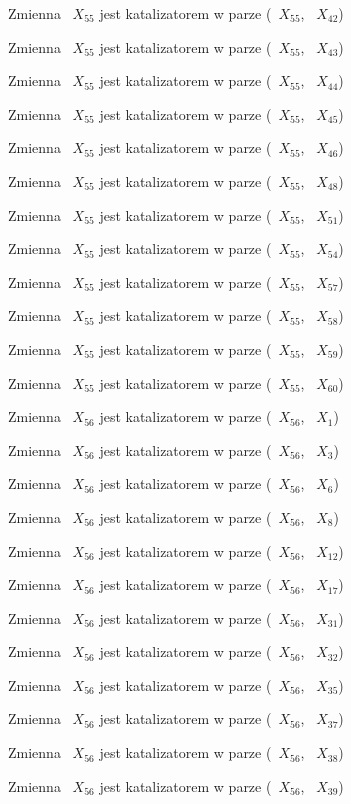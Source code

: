 \documentclass{article}
\begin{document}
Zmienna ~$X_{55}$ jest katalizatorem w parze (~$X_{55}$, ~$X_{42}$)

Zmienna ~$X_{55}$ jest katalizatorem w parze (~$X_{55}$, ~$X_{43}$)

Zmienna ~$X_{55}$ jest katalizatorem w parze (~$X_{55}$, ~$X_{44}$)

Zmienna ~$X_{55}$ jest katalizatorem w parze (~$X_{55}$, ~$X_{45}$)

Zmienna ~$X_{55}$ jest katalizatorem w parze (~$X_{55}$, ~$X_{46}$)

Zmienna ~$X_{55}$ jest katalizatorem w parze (~$X_{55}$, ~$X_{48}$)

Zmienna ~$X_{55}$ jest katalizatorem w parze (~$X_{55}$, ~$X_{51}$)

Zmienna ~$X_{55}$ jest katalizatorem w parze (~$X_{55}$, ~$X_{54}$)

Zmienna ~$X_{55}$ jest katalizatorem w parze (~$X_{55}$, ~$X_{57}$)

Zmienna ~$X_{55}$ jest katalizatorem w parze (~$X_{55}$, ~$X_{58}$)

Zmienna ~$X_{55}$ jest katalizatorem w parze (~$X_{55}$, ~$X_{59}$)

Zmienna ~$X_{55}$ jest katalizatorem w parze (~$X_{55}$, ~$X_{60}$)

Zmienna ~$X_{56}$ jest katalizatorem w parze (~$X_{56}$, ~$X_{1}$)

Zmienna ~$X_{56}$ jest katalizatorem w parze (~$X_{56}$, ~$X_{3}$)

Zmienna ~$X_{56}$ jest katalizatorem w parze (~$X_{56}$, ~$X_{6}$)

Zmienna ~$X_{56}$ jest katalizatorem w parze (~$X_{56}$, ~$X_{8}$)

Zmienna ~$X_{56}$ jest katalizatorem w parze (~$X_{56}$, ~$X_{12}$)

Zmienna ~$X_{56}$ jest katalizatorem w parze (~$X_{56}$, ~$X_{17}$)

Zmienna ~$X_{56}$ jest katalizatorem w parze (~$X_{56}$, ~$X_{31}$)

Zmienna ~$X_{56}$ jest katalizatorem w parze (~$X_{56}$, ~$X_{32}$)

Zmienna ~$X_{56}$ jest katalizatorem w parze (~$X_{56}$, ~$X_{35}$)

Zmienna ~$X_{56}$ jest katalizatorem w parze (~$X_{56}$, ~$X_{37}$)

Zmienna ~$X_{56}$ jest katalizatorem w parze (~$X_{56}$, ~$X_{38}$)

Zmienna ~$X_{56}$ jest katalizatorem w parze (~$X_{56}$, ~$X_{39}$)
\end{document}
